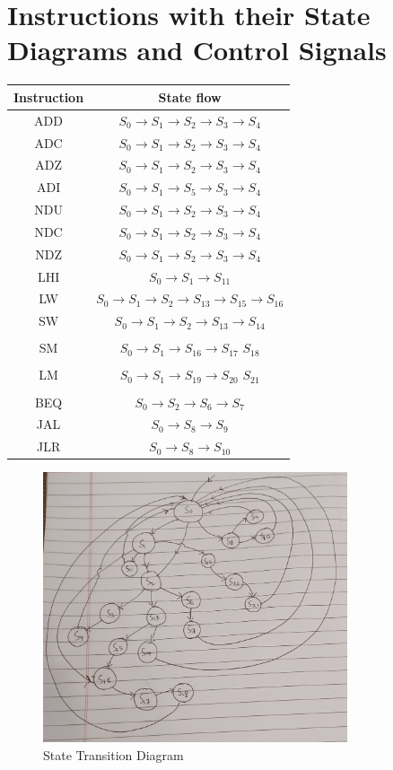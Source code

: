 \documentclass[]{report}
\begin{document}
    \section*{Instructions with their State Diagrams and Control Signals}
        \begin{center}
            \begin{tabular}{|c|c|}
                \hline
                Instruction & State flow\\
                \hline
                ADD & $S_0 \to S_1 \to S_2 \to S_3 \to S_4$\\
                ADC & $S_0 \to S_1 \to S_2 \to S_3 \to S_4$\\
                ADZ & $S_0 \to S_1 \to S_2 \to S_3 \to S_4$\\
                ADI & $S_0 \to S_1 \to S_5 \to S_3 \to S_4$\\
                NDU & $S_0 \to S_1 \to S_2 \to S_3 \to S_4$\\
                NDC & $S_0 \to S_1 \to S_2 \to S_3 \to S_4$\\
                NDZ & $S_0 \to S_1 \to S_2 \to S_3 \to S_4$\\
                LHI & $S_0 \to S_1 \to S_{11}$\\
                LW & $S_0 \to S_1 \to S_2 \to S_{13} \to S_{15} \to S_{16}$\\
                SW & $S_0 \to S_1 \to S_2 \to S_{13} \to S_{14}$\\
                & \\
                SM & $S_0 \to S_1 \to S_{16} \to S_{17} $  $ S_{18}$\\
                & \\
                LM & $S_0 \to S_1 \to S_{19} \to S_{20} $  $ S_{21}$\\
                & \\
                BEQ & $S_0 \to S_2 \to S_6 \to S_7$\\
                JAL & $S_0 \to S_8 \to S_9$\\
                JLR & $S_0 \to S_8 \to S_{10}$\\
                \hline
            \end{tabular}
        \end{center} 
        \begin{figure}[H]
            \begin{center}
                \includegraphics*[width=0.8\textwidth]{StateDiagram.jpg}
                \caption{State Transition Diagram}
            \end{center}
        \end{figure}
            
\end{document}
